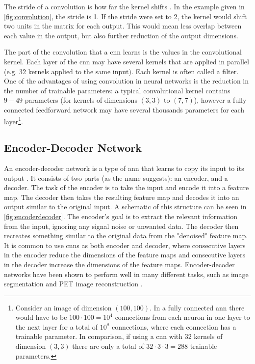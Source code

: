 The stride of a convolution is how far the kernel shifts \cite{oshea2015introduction}. In the example given in \cref{fig:convolution}, the stride is 1. If the stride were set to 2, the kernel would shift two units in the matrix for each output. This would mean less overlap between each value in the output, but also further reduction of the output dimensions. 

The part of the convolution that a \acrshort{cnn} learns is the values in the convolutional kernel. Each layer of the \acrshort{cnn} may have several kernels that are applied in parallel (e.g. 32 kernels applied to the same input). Each kernel is often called a filter. One of the advantages of using convolution in neural networks is the reduction in the number of trainable parameters: a typical convolutional kernel contains $9-49$ parameters (for kernels of dimensions $(3,3)$ to $(7,7)$), however a fully connected feedforward network may have several thousands parameters for each layer\footnote{Consider an image of dimension $(100,100)$. In a fully connected \acrshort{ann} there would have to be $100 \cdot 100 = 10^4$ connections from each neuron in one layer to the next layer for a total of $10^{8}$ connections, where each connection has a trainable parameter. In comparison, if using a \acrshort{cnn} with 32 kernels of dimension $(3,3)$ there are only a total of $32 \cdot 3 \cdot 3 = 288$ trainable parameters. }. 

\subsection{Encoder-Decoder Network}
An encoder-decoder network is a type of \acrshort{ann} that learns to copy its input to its output \cite{https://doi.org/10.1002/aic.690370209}. It consists of two parts (as the name suggests): an encoder, and a decoder. The task of the encoder is to take the input and encode it into a feature map. The decoder then takes the resulting feature map and decodes it into an output similar to the original input. A schematic of this structure can be seen in \cref{fig:encoderdecoder}. The encoder's goal is to extract the relevant information from the input, ignoring any signal noise or unwanted data. The decoder then recreates something similar to the original data from the "denoised" feature map. It is common to use \acrshort{cnn}s as both encoder and decoder, where consecutive layers in the encoder reduce the dimensions of the feature maps and consecutive layers in the decoder increase the dimensions of the feature maps. Encoder-decoder networks have been shown to perform well in many different tasks, such as image segmentation \cite{7803544} and PET image reconstruction \cite{HAGGSTROM2019253}.  

